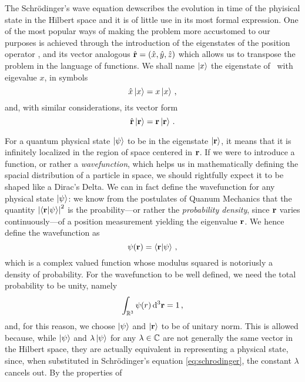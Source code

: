         The Schr\"odinger's wave equation dewscribes the evolution in time of the phyisical state in the Hilbert space and it is of little use in its most formal expression. One of the most popular ways of making the problem more accustomed to our purposes is achieved through the introduction of the eigenstates of the position operator \hx, and its vector analogous $\hvr = \pqty{\hx,\hy,\hz}$ which allows us to transpose the problem in the language of functions. We shall name $\ket{x}$ the eigenstate of \hx\ with eigevalue $x$, in symbols
        \begin{equation}
            \label{eq:x-eigenvalues}
            \hat{x}\ket{x} = x\ket{x}
            \,\text{,}
        \end{equation}
        and, with similar considerations, its vector form
        \begin{equation}
            \label{eq:r-eigenvalues}
            \hat{\vb{r}}\ket{\vb{r}} = \vb{r}\ket{\vb{r}}
            \,\text{.}
        \end{equation}

        For a quantum physical state $\ket{\psi}$ to be in the eigenstate $\ket{\vb{r}}$, it means that it is infinitely localized in the region of space centered in $\vb{r}$. If we were to introduce a function, or rather a \emph{wavefunction}, which helps us in mathematically defining the spacial distribution of a particle in space, we should rightfully expect it to be shaped like a Dirac's Delta. We can in fact define the wavefunction for any physical state $\ket{\psi}$: we know from the postulates of Quanum Mechanics that the quantity $\abs{\braket{\vb{r}}{\psi}}^2$ is the proability---or rather the \emph{probability density}, since $\vb{r}$ varies continuously---of a position measurement yielding the eigenvalue $\vb{r}$. We hence define the wavefunction as
        \begin{equation}
            \label{eq:vavefunction}
            \psi\pqty{\vb{r}} = \braket{\vb{r}}{\psi}
            \mycomma
        \end{equation}
        which is a complex valued function whose modulus squared is notoriusly a density of probability. For the wavefunction to be well defined, we need the total probability to be unity, namely 
        \begin{equation}
            \int\nolimits_{\bbR^3}\psi\pqty{r}\dd[3]{\vb{r}} = 1
            \mycomma
        \end{equation}
        and, for this reason, we choose $\ket{\psi}$ and $\ket{\vb{r}}$ to be of unitary norm. This is allowed because, while $\ket{\psi}$ and $\lambda\ket{\psi}$ for any $\lambda\in\mathbb{C}$ are not generally the same vector in the Hilbert space, they are actually equivalent in representing a physical state, since, when substituted in Schr\"odinger's equation \eqref{eq:schrodinger}, the constant $\lambda$ cancels out. By the properties of 

